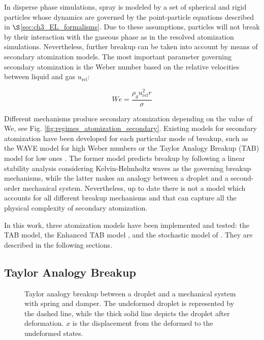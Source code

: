 In disperse phase simulations, spray is modeled by a set of spherical and rigid particles whose dynamics are governed by the point-particle equations described in $\S$\ref{sec:ch3_EL_formalisms}. Due to these assumptions, particles will not break by their interaction with the gaseous phase as in the resolved atomization simulations. Nevertheless, further breakup can be taken into account by means of secondary atomization models. The most important parameter governing secondary atomization is the Weber number based on the relative velocities between liquid and gas $u_\mathrm{rel}$:

\begin{equation}
\label{eq:We_secondary_atomization_definition}
We = \frac{\rho_g u_\mathrm{rel}^2 r}{\sigma} 
\end{equation}

Different mechanisms produce secondary atomization depending on the value of We, see Fig. \ref{fig:regimes_atomization_secondary}. Existing models for secondary atomization have been developed for each particular mode of breakup, such as the WAVE model for high Weber numbers  or the Taylor Analogy Breakup (TAB) model for low ones . The former model predicts breakup by following a linear stability analysis considering Kelvin-Helmholtz waves as the governing breakup mechanisms, while the latter makes an analogy between a droplet and a second-order mechanical system. Nevertheless, up to date there is not a model which accounts for all different breakup mechanisms and that can capture all the physical complexity of secondary atomization.

In this work, three atomization models have been implemented and tested: the TAB model, the Enhanced TAB model , and the stochastic model of . They are described in the following sections.

\subsection{Taylor Analogy Breakup}


\begin{figure}[h!]
	\centering
	\caption{Taylor analogy breakup between a droplet and a mechanical system with spring and damper. The undeformed droplet is represented by the dashed line, while the thick solid line depicts the droplet after deformation. $x$ is the displacement from the deformed to the undeformed states.}
	\label{fig:TAB_droplet_deformation}
\end{figure}

